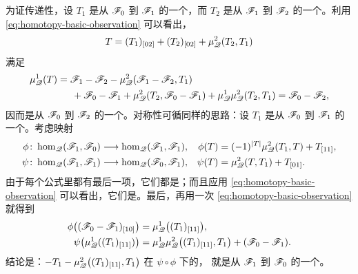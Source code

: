 为证传递性，设 $T_1$ 是从 $\mathscr{F}_0$ 到 $\mathscr{F}_1$ 的一个\trHomotopy，而 $T_2$ 是从
$\mathscr{F}_1$ 到 $\mathscr{F}_2$ 的一个\trHomotopy。利用\eqref{eq:homotopy-basic-observation}
可以看出，
\begin{equation}\label{eq:transitivity-homotopy}
T=(T_1)_{[02]}+(T_2)_{[02]}+\mu^2_{\mathscr{Q}}(T_2,T_1)
\end{equation}
满足
\begin{equation*}
\begin{split}
\mu^1_{\mathscr{Q}}(T)&=\mathscr{F}_1-\mathscr{F}_2-\mu^2_{\mathscr{Q}}(\mathscr{F}_1-\mathscr{F}_2,T_1)\\
&\hspace{1.5em}+\mathscr{F}_0-\mathscr{F}_1+\mu^2_{\mathscr{Q}}(T_2,\mathscr{F}_0-\mathscr{F}_1)
+\mu^1_{\mathscr{Q}}\mu^2_{\mathscr{Q}}(T_2,T_1)=\mathscr{F}_0-\mathscr{F}_2,
\end{split}
\end{equation*}
因而是从 $\mathscr{F}_0$ 到 $\mathscr{F}_2$ 的一个\trHomotopy。对称性可循同样的思路：设 $T_1$ 是从
$\mathscr{F}_0$ 到 $\mathscr{F}_1$ 的一个\trHomotopy。考虑映射
\begin{equation}\label{eq:symmetry-maps-phi-psi}
\begin{aligned}
\phi\colon\hom_{\mathscr{Q}}(\mathscr{F}_1,\mathscr{F}_0)&\longrightarrow
\hom_{\mathscr{Q}}(\mathscr{F}_1,\mathscr{F}_1),&
\phi(T)&=(-1)^{|T|}\mu^2_{\mathscr{Q}}(T_1,T)+T_{[11]},\\
\psi\colon\hom_{\mathscr{Q}}(\mathscr{F}_1,\mathscr{F}_1)&\longrightarrow
\hom_{\mathscr{Q}}(\mathscr{F}_0,\mathscr{F}_1),&
\psi(T)&=\mu^2_{\mathscr{Q}}(T,T_1)+T_{[01]}.
\end{aligned}
\end{equation}
由于每个公式里都有最后一项，它们都是\trIsomorphism；而且应用
\eqref{eq:homotopy-basic-observation} 可以看出，它们是\trChainMap。最后，再用一次
\eqref{eq:homotopy-basic-observation} 就得到
\begin{equation*}
\begin{aligned}
\phi\bigl((\mathscr{F}_0-\mathscr{F}_1)_{[10]}\bigr)&=\mu^1_{\mathscr{Q}}\bigl((T_1)_{[11]}\bigr),\\
\psi\bigl(\mu^1_{\mathscr{Q}}((T_1)_{[11]})\bigr)&=\mu^1_{\mathscr{Q}}\mu^2_{\mathscr{Q}}
\bigl((T_1)_{[11]},T_1\bigr)+(\mathscr{F}_0-\mathscr{F}_1).
\end{aligned}
\end{equation*}
结论是：$-T_1-\mu^2_{\mathscr{Q}}\bigl((T_1)_{[11]},T_1\bigr)$ 在 $\psi\circ\phi$ 下的\trPreimage，
就是从 $\mathscr{F}_1$ 到 $\mathscr{F}_0$ 的一个\trChainHomotopy。


